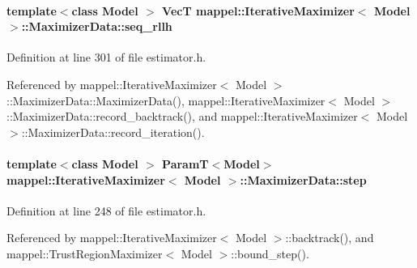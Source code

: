 \paragraph[{\texorpdfstring{seq\+\_\+rllh}{seq_rllh}}]{\setlength{\rightskip}{0pt plus 5cm}template$<$class Model $>$ {\bf VecT} {\bf mappel\+::\+Iterative\+Maximizer}$<$ Model $>$\+::Maximizer\+Data\+::seq\+\_\+rllh\hspace{0.3cm}{\ttfamily [protected]}}\hypertarget{classmappel_1_1IterativeMaximizer_1_1MaximizerData_aaf6e3749e8bf4e8714bac4a48902a4cb}{}\label{classmappel_1_1IterativeMaximizer_1_1MaximizerData_aaf6e3749e8bf4e8714bac4a48902a4cb}


Definition at line 301 of file estimator.\+h.



Referenced by mappel\+::\+Iterative\+Maximizer$<$ Model $>$\+::\+Maximizer\+Data\+::\+Maximizer\+Data(), mappel\+::\+Iterative\+Maximizer$<$ Model $>$\+::\+Maximizer\+Data\+::record\+\_\+backtrack(), and mappel\+::\+Iterative\+Maximizer$<$ Model $>$\+::\+Maximizer\+Data\+::record\+\_\+iteration().

\paragraph[{\texorpdfstring{step}{step}}]{\setlength{\rightskip}{0pt plus 5cm}template$<$class Model $>$ {\bf ParamT}$<$Model$>$ {\bf mappel\+::\+Iterative\+Maximizer}$<$ Model $>$\+::Maximizer\+Data\+::step}\hypertarget{classmappel_1_1IterativeMaximizer_1_1MaximizerData_af592d029ed46c5ec9bedd2291db12920}{}\label{classmappel_1_1IterativeMaximizer_1_1MaximizerData_af592d029ed46c5ec9bedd2291db12920}


Definition at line 248 of file estimator.\+h.



Referenced by mappel\+::\+Iterative\+Maximizer$<$ Model $>$\+::backtrack(), and mappel\+::\+Trust\+Region\+Maximizer$<$ Model $>$\+::bound\+\_\+step().

